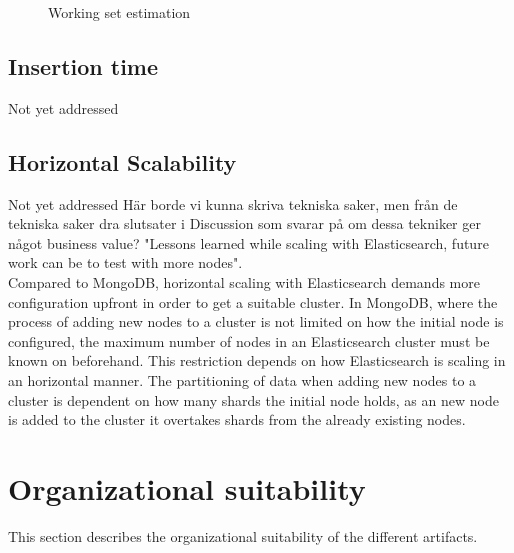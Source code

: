 \begin{figure}[h!]
\centering
{}
\caption{Working set estimation}
\label{fig:ws}
\end{figure}
\subsection{Insertion time}
Not yet addressed
\subsection{Horizontal Scalability}
Not yet addressed
Här borde vi kunna skriva tekniska saker, men från de tekniska saker dra slutsater i Discussion som svarar på om dessa tekniker ger något business value?
"Lessons learned while scaling with Elasticsearch, future work can be to test with more nodes".\\
Compared to MongoDB, horizontal scaling with Elasticsearch demands more configuration upfront in order to get a suitable cluster. 
In MongoDB, where the process of adding new nodes to a cluster is not limited on how the initial node is configured, the maximum number of nodes in an Elasticsearch cluster must be known on beforehand. This restriction depends on how Elasticsearch is scaling in an horizontal manner. The partitioning of data when adding new nodes to a cluster is dependent on how many shards the initial node holds, as an new node is added to the cluster it overtakes shards from the already existing nodes.

\section{Organizational suitability}
This section describes the organizational suitability of the different artifacts.
